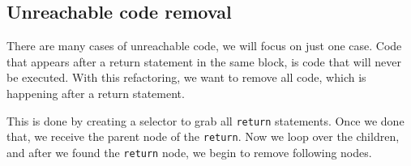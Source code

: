 \subsection{Unreachable code removal}

There are many cases of unreachable code, we will focus on just one case. Code that appears after a return statement in the same block, is code that will never be executed.
With this refactoring, we want to remove all code, which is happening after a return statement.

This is done by creating a selector to grab all \verb|return| statements. Once we done that, we receive the parent node of the \verb|return|. Now we loop over the children, and after we found the \verb|return| node, we begin to remove following nodes.
